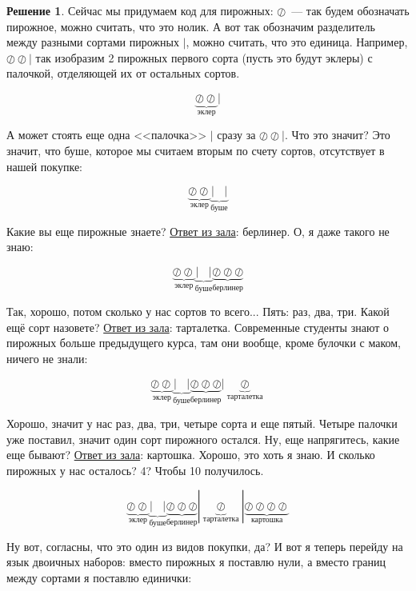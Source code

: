 \documentclass[russian]{lecture-notes}
\theoremstyle{definition}
\newtheorem*{solution}{Решение}
\begin{document}
\begin{enumerate}
		\begin{solution}
			Сейчас мы придумаем код для пирожных: $\oslash$~--- так будем обозначать пирожное, можно считать, что это нолик. А вот так обозначим разделитель между разными сортами пирожных $|$, можно считать, что это единица. Например, $\oslash \oslash |$ так изобразим 2 пирожных первого сорта (пусть это будут эклеры) с палочкой, отделяющей их от остальных сортов.
			
			\[
				\underbrace{\oslash \oslash}_{\text{эклер}} |
			\]
			
			А может стоять еще одна <<палочка>> $|$ сразу за $\oslash \oslash |$. Что это значит? Это значит, что буше, которое мы считаем вторым по счету сортов, отсутствует в нашей покупке:
			
			\[
				\underbrace{\oslash \oslash}_{\text{эклер}}  \underbrace{| \ \ \ \ |}_{\text{буше}}
			\]
			
			Какие вы еще пирожные знаете? \underline{Ответ из зала}: берлинер. О, я даже такого не знаю:
			
			\[
				\underbrace{\oslash \oslash}_{\text{эклер}}  \underbrace{| \ \ \ \ |}_{\text{буше}} \underbrace{\oslash \oslash \oslash}_{\text{берлинер}}
			\]
			
			Так, хорошо, потом сколько у нас сортов то всего... Пять: раз, два, три. Какой ещё сорт назовете? \underline{Ответ из зала}: тарталетка. Современные студенты знают о пирожных больше предыдущего курса, там они вообще, кроме булочки с маком, ничего не знали:
			
			\[
				\underbrace{\oslash \oslash}_{\text{эклер}}  \underbrace{| \ \ \ \ |}_{\text{буше}} \underbrace{\oslash \oslash \oslash}_{\text{берлинер}} | \underbrace{\oslash}_{\text{тарталетка}}
			\]
			
			Хорошо, значит у нас раз, два, три, четыре сорта и еще пятый. Четыре палочки уже поставил, значит один сорт пирожного остался. Ну, еще напрягитесь, какие еще бывают? \underline{Ответ из зала}: картошка. Хорошо, это хоть я знаю. И сколько пирожных у нас осталось? 4? Чтобы 10 получилось.
			
			\[
				\underbrace{\oslash \oslash}_{\text{эклер}}  \underbrace{| \ \ \ \ |}_{\text{буше}} \underbrace{\oslash \oslash \oslash}_{\text{берлинер}} | \underbrace{\oslash}_{\text{тарталетка}} | \underbrace{\oslash \oslash \oslash \oslash}_{\text{картошка}}
			\]
			
			Ну вот, согласны, что это один из видов покупки, да? И вот я теперь перейду на язык двоичных наборов: вместо пирожных я поставлю нули, а вместо границ между сортами я поставлю единички:
			

\end{solution}
\end{enumerate}
\end{document}
